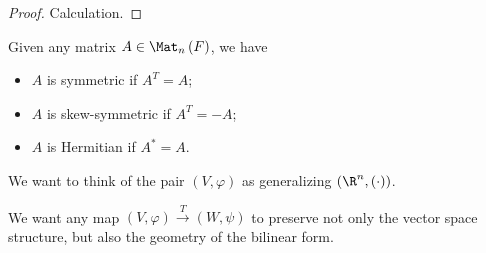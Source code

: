 \documentclass[10pt]{mypackage}
\begin{document}
  \begin{proof}
    Calculation.
  \end{proof}
  Given any matrix $A\in \Mat_{n}\left(F\right)$, we have
  \begin{itemize}
    \item $A$ is symmetric if $A^{T} = A$;
    \item $A$ is skew-symmetric if $A^{T} = -A$;
    \item $A$ is Hermitian if $A^{\ast} = A$.
  \end{itemize}
  We want to think of the pair $\left(V,\varphi\right)$ as generalizing $\left(\R^n,\left(\cdot\right)\right)$.\newline

  We want any map $\left(V,\varphi\right) \xrightarrow{T} \left(W,\psi\right)$ to preserve not only the vector space structure, but also the geometry of the bilinear form.\newline
\end{document}
